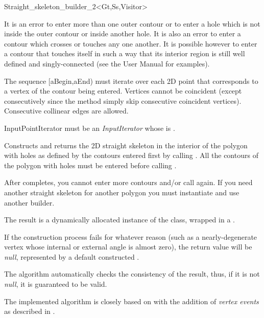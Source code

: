 \begin{ccRefClass}{Straight_skeleton_builder_2<Gt,Ss,Visitor>}
{It is an error to enter more than one outer contour or to enter a hole which is not inside the outer contour or inside another hole. It is also an error to enter a contour which crosses or touches any one another. It is possible however to enter a contour that touches itself in such a way that its interior region is still well defined and singly-connected (see the User Manual for examples).

The sequence [aBegin,aEnd) must iterate over each 2D point that corresponds to a vertex of the contour being entered. Vertices cannot be coincident (except consecutively since the method simply skip consecutive coincident vertices). Consecutive collinear edges are allowed.

InputPointIterator must be an \textit{InputIterator} whose  is .}
   
\ccGlue
{}
{Constructs and returns the 2D straight skeleton in the interior of the polygon with holes as defined by the contours entered first by calling . All the contours of the polygon with holes must be entered before calling .

After  completes, you cannot enter more contours and/or call  again. If you need another straight skeleton for another polygon you must instantiate and use another builder.

The result is a dynamically allocated instance of the  class, wrapped in a .

If the construction process fails for whatever reason (such as a nearly-degenerate vertex whose internal or external angle is almost zero), the return value will be {\em null}, represented by a default constructed .

The algorithm automatically checks the consistency of the result, thus, if it is not {\em null}, it is guaranteed to be valid.
}




The implemented algorithm is closely based on \cite{cgal:fo-ss-98} with the addition of \textit{vertex events} as described in \cite{cgal:ee-rrccpp-98}.


\end{ccRefClass}

